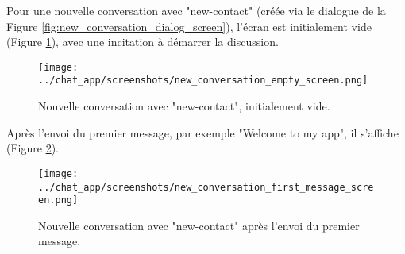 \documentclass[12pt,a4paper]{article}
\begin{document}
Pour une nouvelle conversation avec "new-contact" (créée via le dialogue de la Figure \ref{fig:new_conversation_dialog_screen}), l'écran est initialement vide (Figure \ref{fig:new_conversation_empty_screen}), avec une incitation à démarrer la discussion.

\begin{figure}[htbp]
    \centering
    \texttt{[image: ../chat\_app/screenshots/new\_conversation\_empty\_screen.png]}
    \caption{Nouvelle conversation avec "new-contact", initialement vide.}
    \label{fig:new_conversation_empty_screen}
\end{figure}

Après l'envoi du premier message, par exemple "Welcome to my app", il s'affiche (Figure \ref{fig:new_conversation_first_message_screen}).

\begin{figure}[htbp]
    \centering
    \texttt{[image: ../chat\_app/screenshots/new\_conversation\_first\_message\_screen.png]}
    \caption{Nouvelle conversation avec "new-contact" après l'envoi du premier message.}
    \label{fig:new_conversation_first_message_screen}
\end{figure}
\end{document}
